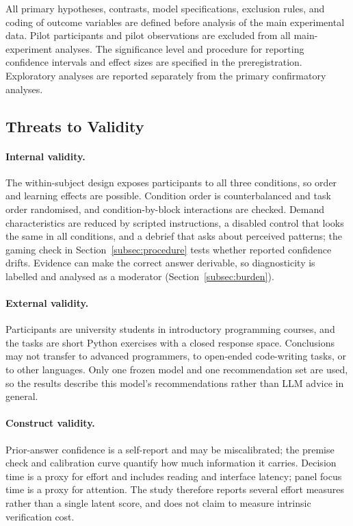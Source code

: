\documentclass[oneside,final,14pt,a4paper]{extreport}
\begin{document}
All primary hypotheses, contrasts, model specifications, exclusion rules, and
coding of outcome variables are defined before analysis of the main
experimental data. Pilot participants and pilot observations are excluded
from all main-experiment analyses. The significance level and procedure for
reporting confidence intervals and effect sizes are specified in the
preregistration. Exploratory analyses are reported separately from the
primary confirmatory analyses.


\subsection{Threats to Validity}
\label{subsec:threats}

\paragraph{Internal validity.}
The within-subject design exposes participants to all three conditions, so
order and learning effects are possible. Condition order is counterbalanced and
task order randomised, and condition-by-block interactions are checked. Demand
characteristics are reduced by scripted instructions, a disabled control that
looks the same in all conditions, and a debrief that asks about perceived
patterns; the gaming check in Section~\ref{subsec:procedure} tests whether
reported confidence drifts. Evidence can make the correct answer derivable, so
diagnosticity is labelled and analysed as a moderator
(Section~\ref{subsec:burden}).

\paragraph{External validity.}
Participants are university students in introductory programming courses, and
the tasks are short Python exercises with a closed response space. Conclusions
may not transfer to advanced programmers, to open-ended code-writing tasks, or
to other languages. Only one frozen model and one recommendation set are used,
so the results describe this model's recommendations rather than LLM advice in
general.

\paragraph{Construct validity.}
Prior-answer confidence is a self-report and may be miscalibrated; the premise
check and calibration curve quantify how much information it carries.
Decision time is a proxy for effort and includes reading and interface
latency; panel focus time is a proxy for attention. The study therefore
reports several effort measures rather than a single latent score, and does
not claim to measure intrinsic verification cost.
\end{document}
